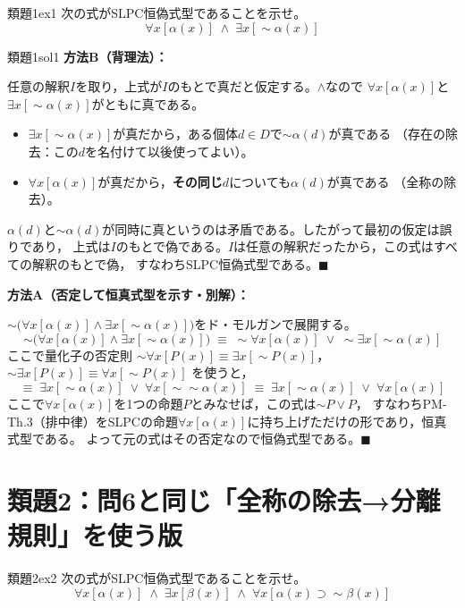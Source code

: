 \documentclass[autodetect-engine,dvi=dvipdfmx,ja=standard]{bxjsarticle}
\begin{document}
\begin{exercise}{類題1}{ex1}
次の式がSLPC恒偽式型であることを示せ。
\[
  \forall x[\alpha(x)]\;\land\;\exists x[\sim\alpha(x)]
\]
\end{exercise}

\begin{solution}{類題1}{sol1}
\textbf{方法B（背理法）：}

任意の解釈\(I\)を取り，上式が\(I\)のもとで真だと仮定する。\(\land\)なので
\(\forall x[\alpha(x)]\)と\(\exists x[\sim\alpha(x)]\)がともに真である。

\begin{itemize}
  \item \(\exists x[\sim\alpha(x)]\)が真だから，ある個体\(d\in D\)で\(\sim\alpha(d)\)が真である
    （存在の除去：この\(d\)を名付けて以後使ってよい）。
  \item \(\forall x[\alpha(x)]\)が真だから，\textbf{その同じ}\(d\)についても\(\alpha(d)\)が真である
    （全称の除去）。
\end{itemize}
\(\alpha(d)\)と\(\sim\alpha(d)\)が同時に真というのは矛盾である。したがって最初の仮定は誤りであり，
上式は\(I\)のもとで偽である。\(I\)は任意の解釈だったから，この式はすべての解釈のもとで偽，
すなわちSLPC恒偽式型である。\hfill\(\blacksquare\)

\textbf{方法A（否定して恒真式型を示す・別解）：}

\(\sim\bigl(\forall x[\alpha(x)]\land\exists x[\sim\alpha(x)]\bigr)\)をド・モルガンで展開する。
\[
  \sim\bigl(\forall x[\alpha(x)]\land\exists x[\sim\alpha(x)]\bigr)
  \;\equiv\;
  \sim\forall x[\alpha(x)]\;\lor\;\sim\exists x[\sim\alpha(x)]
\]
ここで量化子の否定則 \(\sim\forall x[P(x)]\equiv\exists x[\sim P(x)]\)，
\(\sim\exists x[P(x)]\equiv\forall x[\sim P(x)]\) を使うと，
\[
  \equiv\;
  \exists x[\sim\alpha(x)]\;\lor\;\forall x[\sim\sim\alpha(x)]
  \;\equiv\;
  \exists x[\sim\alpha(x)]\;\lor\;\forall x[\alpha(x)]
\]
ここで\(\forall x[\alpha(x)]\)を1つの命題\(P\)とみなせば，この式は\(\sim P\lor P\)，
すなわちPM-Th.3（排中律）をSLPCの命題\(\forall x[\alpha(x)]\)に持ち上げただけの形であり，恒真式型である。
よって元の式はその否定なので恒偽式型である。\hfill\(\blacksquare\)
\end{solution}

\section{類題2：問6と同じ「全称の除去→分離規則」を使う版}

\begin{exercise}{類題2}{ex2}
次の式がSLPC恒偽式型であることを示せ。
\[
  \forall x[\alpha(x)]\;\land\;\exists x[\beta(x)]\;\land\;\forall x[\alpha(x)\supset\sim\beta(x)]
\]
\end{exercise}
\end{document}
